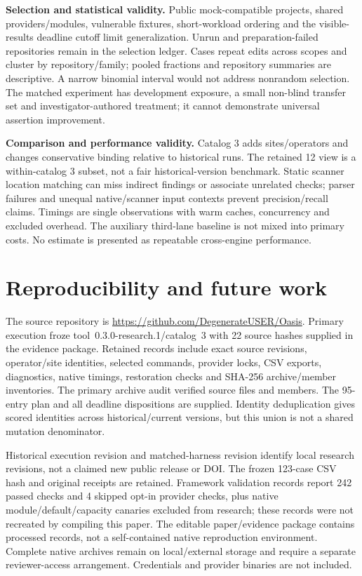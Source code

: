 \textbf{Selection and statistical validity.} Public mock-compatible projects, shared providers/modules, vulnerable fixtures, short-workload ordering and the visible-results deadline cutoff limit generalization. Unrun and preparation-failed repositories remain in the selection ledger. Cases repeat edits across scopes and cluster by repository/family; pooled fractions and repository summaries are descriptive. A narrow binomial interval would not address nonrandom selection. The matched experiment has development exposure, a small non-blind transfer set and investigator-authored treatment; it cannot demonstrate universal assertion improvement.

\textbf{Comparison and performance validity.} Catalog 3 adds sites/operators and changes conservative binding relative to historical runs. The retained 12 view is a within-catalog 3 subset, not a fair historical-version benchmark. Static scanner location matching can miss indirect findings or associate unrelated checks; parser failures and unequal native/scanner input contexts prevent precision/recall claims. Timings are single observations with warm caches, concurrency and excluded overhead. The auxiliary third-lane baseline is not mixed into primary costs. No estimate is presented as repeatable cross-engine performance.

\section{Reproducibility and future work}\label{sec:repro}
The source repository is \url{https://github.com/DegenerateUSER/Oasis}. Primary execution froze tool~0.3.0-research.1/catalog~3 with 22 source hashes supplied in the evidence package. Retained records include exact source revisions, operator/site identities, selected commands, provider locks, CSV exports, diagnostics, native timings, restoration checks and SHA-256 archive/member inventories. The primary archive audit verified \VerifiedSourceFiles{} source files and \VerifiedArchiveMembers{} members. The 95-entry plan and all deadline dispositions are supplied. Identity deduplication gives \UnionScoredRepos{} scored identities across historical/current versions, but this union is not a shared mutation denominator.

Historical execution revision  and matched-harness revision  identify local research revisions, not a claimed new public release or DOI. The frozen 123-case CSV hash and original receipts are retained. Framework validation records report 242 passed checks and 4 skipped opt-in provider checks, plus native module/default/capacity canaries excluded from research; these records were not recreated by compiling this paper. The editable paper/evidence package contains processed records, not a self-contained native reproduction environment. Complete native archives remain on local/external storage and require a separate reviewer-access arrangement. Credentials and provider binaries are not included.

